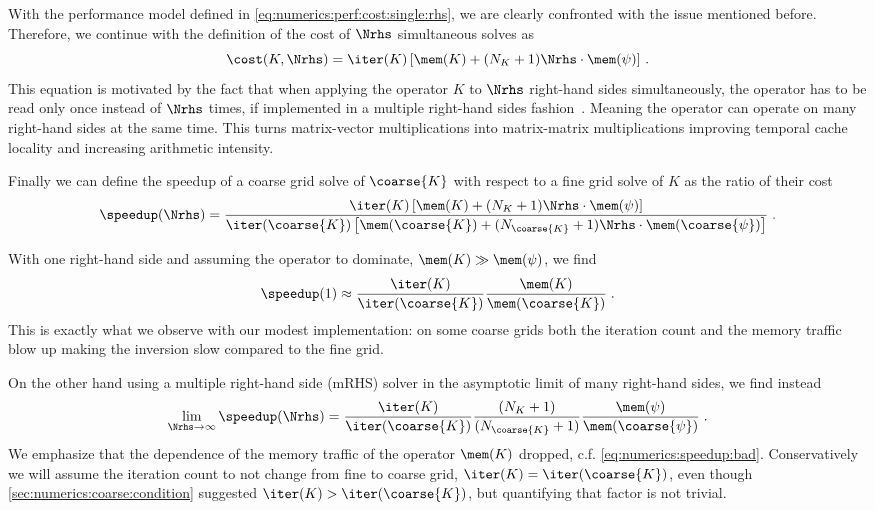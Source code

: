 With the performance model defined in \cref{eq:numerics:perf:cost:single:rhs}, we are clearly confronted with the issue mentioned before.
Therefore, we continue with the definition of the cost of $\Nrhs$ simultaneous solves as
\begin{equation}
\cost(K, \Nrhs) = \iter(K) \left[ \mem(K) + (N_{K} + 1) \Nrhs \cdot \mem(\psi) \right] \,.
\end{equation}
This equation is motivated by the fact that when applying the operator $K$ to $\Nrhs$ right-hand sides simultaneously, the operator has to be read only once instead of $\Nrhs$ times, if implemented in a multiple right-hand sides fashion~\cite{Boyle:2024pio}.
Meaning the operator can operate on many right-hand sides at the same time.
This turns matrix-vector multiplications into matrix-matrix multiplications improving temporal cache locality and increasing arithmetic intensity.

Finally we can define the speedup of a coarse grid solve of $\coarse{K}$ with respect to a fine grid solve of $K$ as the ratio of their cost
\begin{equation}
\speedup(\Nrhs)
= \frac{
   \iter(K) \left[ \mem(K) + (N_{K} + 1) \Nrhs \cdot \mem(\psi) \right]
}{
   \iter(\coarse{K}) \left[ \mem(\coarse{K}) + (N_{\coarse{K}} + 1) \Nrhs \cdot \mem(\coarse{\psi}) \right]
} \;.
\end{equation}

With one right-hand side and assuming the operator to dominate, $\mem(K) \gg \mem(\psi)$, we find
\begin{equation} \label{eq:numerics:speedup:bad}
\speedup(1)
\approx \frac{ \iter(K) }{ \iter(\coarse{K}) }
  \frac{ \mem(K) }{ \mem(\coarse{K}) } \;.
\end{equation}
This is exactly what we observe with our modest implementation: on some coarse grids both the iteration count and the memory traffic blow up making the inversion slow compared to the fine grid.

On the other hand using a multiple right-hand side (mRHS) solver in the asymptotic limit of many right-hand sides, we find instead
\begin{equation}
\lim_{\Nrhs \to \infty} \speedup(\Nrhs)
= \frac{ \iter(K) }{ \iter(\coarse{K}) }
\frac{ (N_{K} + 1) }{ (N_{\coarse{K}} + 1) }
  \frac{ \mem(\psi) }{ \mem(\coarse{\psi}) } \;.
\end{equation}
We emphasize that the dependence of the memory traffic of the operator $\mem(K)$ dropped, c.f. \cref{eq:numerics:speedup:bad}.
Conservatively we will assume the iteration count to not change from fine to coarse grid, \ie $\iter(K) = \iter(\coarse{K})$, even though \cref{sec:numerics:coarse:condition} suggested $\iter(K) > \iter(\coarse{K})$, but quantifying that factor is not trivial.

